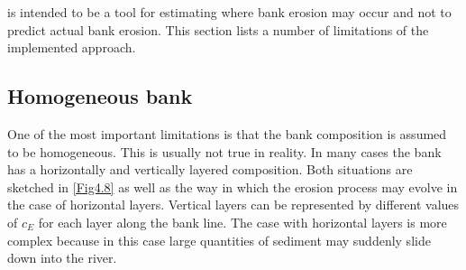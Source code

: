 \dfastbe is intended to be a tool for estimating where bank erosion may occur and not to predict actual bank erosion.
This section lists a number of limitations of the implemented approach.

\subsection{Homogeneous bank}

One of the most important limitations is that the bank composition is assumed to be homogeneous.
This is usually not true in reality.
In many cases the bank has a horizontally and vertically layered composition.
Both situations are sketched in \autoref{Fig4.8} as well as the way in which the erosion process may evolve in the case of horizontal layers.
Vertical layers can be represented by different values of $c_E$ for each layer along the bank line.
The case with horizontal layers is more complex because in this case large quantities of sediment may suddenly slide down into the river.

